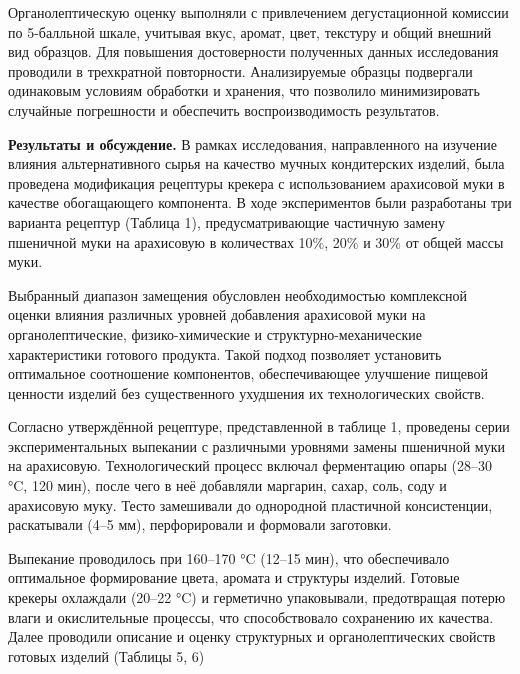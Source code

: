 \begin{multicols}{2}
Органолептическую оценку выполняли с привлечением дегустационной
комиссии по 5-балльной шкале, учитывая вкус, аромат, цвет, текстуру и
общий внешний вид образцов. Для повышения достоверности полученных
данных исследования проводили в трехкратной повторности. Анализируемые
образцы подвергали одинаковым условиям обработки и хранения, что
позволило минимизировать случайные погрешности и обеспечить
воспроизводимость результатов.

{\bfseries Результаты и обсуждение.} В рамках исследования, направленного
на изучение влияния альтернативного сырья на качество мучных
кондитерских изделий, была проведена модификация рецептуры крекера с
использованием арахисовой муки в качестве обогащающего компонента. В
ходе экспериментов были разработаны три варианта рецептур (Таблица 1),
предусматривающие частичную замену пшеничной муки на арахисовую в
количествах 10\%, 20\% и 30\% от общей массы муки.

Выбранный диапазон замещения обусловлен необходимостью комплексной
оценки влияния различных уровней добавления арахисовой муки на
органолептические, физико-химические и структурно-механические
характеристики готового продукта. Такой подход позволяет установить
оптимальное соотношение компонентов, обеспечивающее улучшение пищевой
ценности изделий без существенного ухудшения их технологических свойств.

Согласно утверждённой рецептуре, представленной в таблице 1, проведены
серии экспериментальных выпекании с различными уровнями замены пшеничной
муки на арахисовую. Технологический процесс включал ферментацию опары
(28--30 °C, 120 мин), после чего в неё добавляли маргарин, сахар, соль,
соду и арахисовую муку. Тесто замешивали до однородной пластичной
консистенции, раскатывали (4--5 мм), перфорировали и формовали
заготовки.

Выпекание проводилось при 160--170 °C (12--15 мин), что обеспечивало
оптимальное формирование цвета, аромата и структуры изделий. Готовые
крекеры охлаждали (20--22 °C) и герметично упаковывали, предотвращая
потерю влаги и окислительные процессы, что способствовало сохранению их
качества. Далее проводили описание и оценку структурных и
органолептических свойств готовых изделий (Таблицы 5, 6)
\end{multicols}

